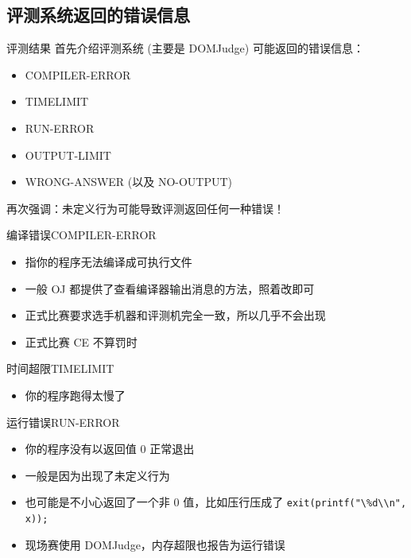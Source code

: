 \documentclass[10pt,mathserif]{beamer}
\begin{document}
\subsection{评测系统返回的错误信息}

\begin{frame}{评测结果}
	首先介绍评测系统 (主要是 DOMJudge) 可能返回的错误信息：
	\begin{itemize}
		\item COMPILER-ERROR
		\item TIMELIMIT
		\item RUN-ERROR
		\item OUTPUT-LIMIT
		\item WRONG-ANSWER (以及 NO-OUTPUT)
	\end{itemize}
	再次强调：未定义行为可能导致评测返回任何一种错误！
\end{frame}

\begin{frame}{编译错误}{COMPILER-ERROR}
	\begin{itemize}
		\item 指你的程序无法编译成可执行文件
		\item 一般 OJ 都提供了查看编译器输出消息的方法，照着改即可
		\item 正式比赛要求选手机器和评测机完全一致，所以几乎不会出现
		\item 正式比赛 CE 不算罚时
	\end{itemize}
\end{frame}

\begin{frame}{时间超限}{TIMELIMIT}
	\begin{itemize}
		\item 你的程序跑得太慢了
	\end{itemize}
\end{frame}

\begin{frame}{运行错误}{RUN-ERROR}
	\begin{itemize}
		\item 你的程序没有以返回值 $0$ 正常退出
		\item 一般是因为出现了未定义行为
		\item 也可能是不小心返回了一个非 $0$ 值，比如压行压成了
			\lstinline{exit(printf("\%d\\n", x));}
		\item 现场赛使用 DOMJudge，内存超限也报告为运行错误
	\end{itemize}
\end{frame}
\end{document}
